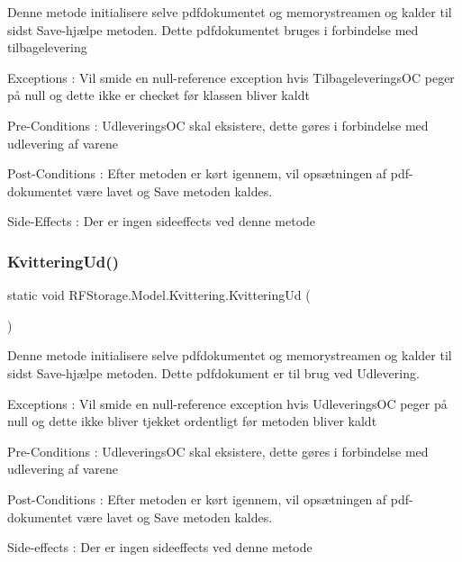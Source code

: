 Denne metode initialisere selve pdfdokumentet og memorystreamen og kalder til sidst Save-\/hjælpe metoden. Dette pdfdokumentet bruges i forbindelse med tilbagelevering 

Exceptions \+: Vil smide en null-\/reference exception hvis Tilbageleverings\+OC peger på null og dette ikke er checket før klassen bliver kaldt 

Pre-\/\+Conditions \+: Udleverings\+OC skal eksistere, dette gøres i forbindelse med udlevering af varene 

Post-\/\+Conditions \+: Efter metoden er kørt igennem, vil opsætningen af pdf-\/dokumentet være lavet og Save metoden kaldes. 

Side-\/\+Effects \+: Der er ingen sideeffects ved denne metode \mbox{\label{class_r_f_storage_1_1_model_1_1_kvittering_acca12604adfc5e6138058525889eae03}} 
\subsubsection{KvitteringUd()}
{\footnotesize\ttfamily static void R\+F\+Storage.\+Model.\+Kvittering.\+Kvittering\+Ud (\begin{DoxyParamCaption}{ }\end{DoxyParamCaption})\hspace{0.3cm}{\ttfamily [static]}}



Denne metode initialisere selve pdfdokumentet og memorystreamen og kalder til sidst Save-\/hjælpe metoden. Dette pdfdokument er til brug ved Udlevering. 

Exceptions \+: Vil smide en null-\/reference exception hvis Udleverings\+OC peger på null og dette ikke bliver tjekket ordentligt før metoden bliver kaldt

Pre-\/\+Conditions \+: Udleverings\+OC skal eksistere, dette gøres i forbindelse med udlevering af varene 

Post-\/\+Conditions \+: Efter metoden er kørt igennem, vil opsætningen af pdf-\/dokumentet være lavet og Save metoden kaldes. 

Side-\/effects \+: Der er ingen sideeffects ved denne metode\mbox{\label{class_r_f_storage_1_1_model_1_1_kvittering_abf9118e928ad6a4cc9e771b0875353ab}} 
